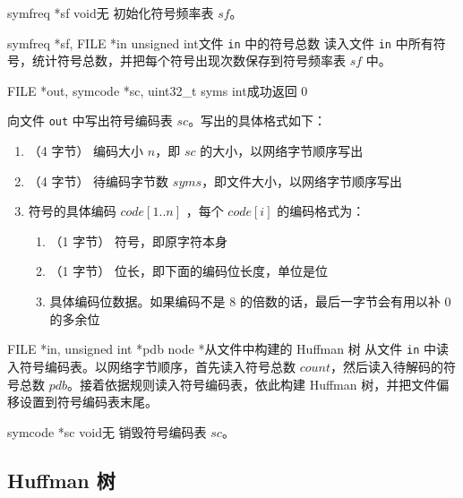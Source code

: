 {symfreq *sf}
{void}{无}
{初始化符号频率表 $sf$。}

{symfreq *sf, FILE *in}
{unsigned int}{文件 {\tt in} 中的符号总数}
{读入文件 {\tt in} 中所有符号，统计符号总数，并把每个符号出现次数保存到符号频率表 $sf$ 中。}

{FILE *out, symcode *sc, uint32\_t syms}
{int}{成功返回 0}
{向文件 {\tt out} 中写出符号编码表 $sc$。写出的具体格式如下：
\begin{enumerate}[topsep=0pt,partopsep=0pt,itemsep=0pt,parsep=0pt]
  \item （4 字节） 编码大小 $n$，即 $sc$ 的大小，以网络字节顺序写出
  \item （4 字节） 待编码字节数 $syms$，即文件大小，以网络字节顺序写出
  \item 符号的具体编码 $code[1..n]$ ，每个 $code[i]$ 的编码格式为：
  \begin{enumerate}[topsep=0pt,partopsep=0pt,itemsep=0pt,parsep=0pt]
    \item （1 字节） 符号，即原字符本身
    \item （1 字节） 位长，即下面的编码位长度，单位是位
    \item 具体编码位数据。如果编码不是 8 的倍数的话，最后一字节会有用以补 0 的多余位
  \end{enumerate}
\end{enumerate}
}

{FILE *in, unsigned int *pdb}
{node *}{从文件中构建的 Huffman 树}
{从文件 {\tt in} 中读入符号编码表。以网络字节顺序，首先读入符号总数 $count$，然后读入待解码的符号总数 $pdb$。接着依据规则读入符号编码表，依此构建 Huffman 树，并把文件偏移设置到符号编码表末尾。}

{symcode *sc}
{void}{无}
{销毁符号编码表 $sc$。}

\subsection{Huffman 树}

\begin{center}
\end{center}

